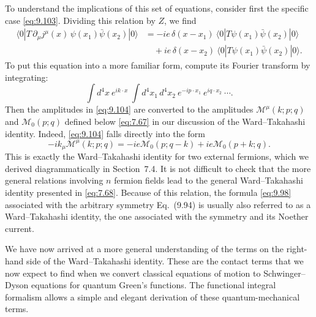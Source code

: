 To understand the implications of this set of equations, consider first the
specific case \eqref{eq:9.103}.  Dividing this relation by $Z$, we find
\begin{equation}
  \begin{aligned}
    \langle 0|T\,\partial_\mu j^\mu(x)\,\psi(x_1)\bar{\psi}(x_2)|0\rangle
    &= -ie\,\delta(x-x_1)\ \langle 0|T\psi(x_1)\bar{\psi}(x_2)|0\rangle\\
    &\quad + ie\,\delta(x-x_2)\ \langle 0|T\psi(x_1)\bar{\psi}(x_2)|0\rangle .
  \end{aligned}
  \label{eq:9.104}
\end{equation}
To put this equation into a more familiar form, compute its Fourier transform
by integrating:
\begin{equation}
  \int d^4x\ e^{ik\cdot x}\ \int d^4x_1\,d^4x_2\ e^{-ip\cdot x_1}\
    e^{iq\cdot x_2}\ \cdots .
  \label{eq:9.105}
\end{equation}
Then the amplitudes in \eqref{eq:9.104} are converted to the amplitudes
$\mathcal{M}^\mu(k;p;q)$ and $\mathcal{M}_0(p;q)$ defined below \eqref{eq:7.67}
in our discussion of the Ward--Takahashi identity.  Indeed, \eqref{eq:9.104}
falls directly into the form
\begin{equation}
  -ik_\mu\mathcal{M}^\mu(k;p;q) = -ie\mathcal{M}_0(p;q-k)
    + ie\mathcal{M}_0(p+k;q) .
  \label{eq:9.106}
\end{equation}
This is exactly the Ward--Takahashi identity for two external fermions, which
we derived diagrammatically in Section~7.4.  It is not difficult to check that
the more general relations involving $n$ fermion fields lead to the general
Ward--Takahashi identity presented in \eqref{eq:7.68}.  Because of this
relation, the formula \eqref{eq:9.98} associated with the arbitrary symmetry
Eq.~(9.94) is usually also referred to as a Ward--Takahashi identity, the
one associated with the symmetry and its Noether current.

We have now arrived at a more general understanding of the terms on the
right-hand side of the Ward--Takahashi identity.  These are the contact terms
that we now expect to find when we convert classical equations of motion to
Schwinger--Dyson equations for quantum Green's functions.  The functional
integral formalism allows a simple and elegant derivation of these
quantum-mechanical terms.

\problems

